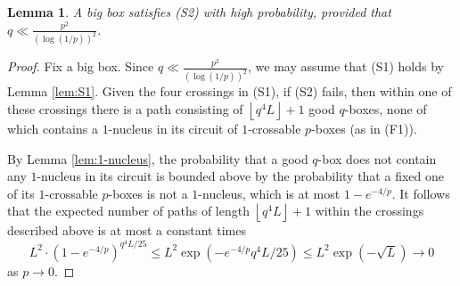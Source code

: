 \documentclass{article}
\newcommand{\floor}[1]{\left\lfloor#1\right \rfloor}
\numberwithin{equation}{section}
\newtheorem{lemma}[theorem]{Lemma}
\begin{document}
\begin{lemma}\label{lem:S2}
    A big box satisfies (S2) with high probability, provided that $q \ll \frac{p^2}{(\log(1/p))^2}$.
\end{lemma}
\begin{proof}   
    Fix a big box.
    Since $q \ll \frac{p^2}{(\log(1/p))^2}$, we may assume that (S1) holds by Lemma \ref{lem:S1}.
    Given the four crossings in (S1), if (S2) fails, then within one of these crossings there is a path consisting of $\floor{q^4L} + 1$ good $q$-boxes,  none of which contains a $1$-nucleus in its circuit of $1$-crossable $p$-boxes (as in (F1)).

     By Lemma \ref{lem:1-nucleus}, the probability that a good $q$-box does not contain any $1$-nucleus in its circuit is bounded above by the probability that a fixed one of its $1$-crossable $p$-boxes is 
    not a $1$-nucleus, which is at most $1-e^{-4/p}$. It follows that the expected number of paths of length $\floor{q^4L} + 1$ within the crossings described above  is at most
    a constant times
    \[
        L^2 \cdot \left(1-e^{-4/p}\right) ^{q^4L/25}
        \leq 
        L^2 \exp\left(-e^{-4/p}q^4L/25\right) 
        \leq
        L^2 \exp\left(-\sqrt{L}\right) \to 0
    \]
    as $p \to 0$.   
\end{proof}
\end{document}
